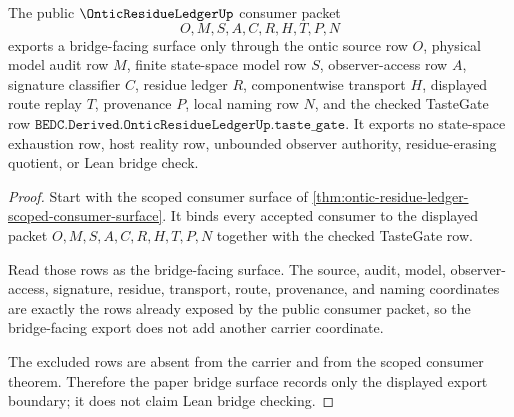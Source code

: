 \begin{theorem}
\label{thm:ontic-residue-ledger-bridge-export}
The public $\OnticResidueLedgerUp$ consumer packet
$$
O,M,S,A,C,R,H,T,P,N
$$
exports a bridge-facing surface only through the ontic source row $O$, physical model audit row $M$, finite state-space model row $S$, observer-access row $A$, signature classifier $C$, residue ledger $R$, componentwise transport $H$, displayed route replay $T$, provenance $P$, local naming row $N$, and the checked TasteGate row $\texttt{BEDC.Derived.OnticResidueLedgerUp.taste\_gate}$. It exports no state-space exhaustion row, host reality row, unbounded observer authority, residue-erasing quotient, or Lean bridge check.
\end{theorem}
\begin{proof}
Start with the scoped consumer surface of \autoref{thm:ontic-residue-ledger-scoped-consumer-surface}. It binds every accepted consumer to the displayed packet $O,M,S,A,C,R,H,T,P,N$ together with the checked TasteGate row.

Read those rows as the bridge-facing surface. The source, audit, model, observer-access, signature, residue, transport, route, provenance, and naming coordinates are exactly the rows already exposed by the public consumer packet, so the bridge-facing export does not add another carrier coordinate.

The excluded rows are absent from the carrier and from the scoped consumer theorem. Therefore the paper bridge surface records only the displayed export boundary; it does not claim Lean bridge checking.
\end{proof}


